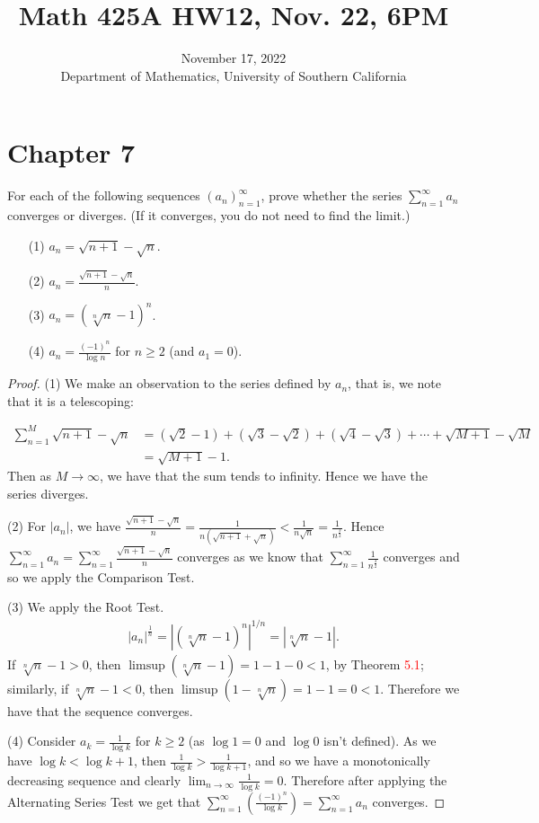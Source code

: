 \documentclass[oneside]{amsart}
\title{Math 425A HW12, Nov. 22, 6PM}
\date{November 17, 2022 \\ {Department of Mathematics, University of Southern California}}
\theoremstyle{definition}
\begin{document}
\maketitle
\setcounter{tocdepth}{4}
\setcounter{secnumdepth}{4}
 \section*{Chapter 7}
\begin{tcolorbox}[colback=black!5!white,colframe=black!75!black,title= Exercise $2.1.$]  For each of the following sequences $(a_n)_{n=1}^\infty$, prove whether the series $ \sum _{n=1}^\infty a_n$ converges or diverges. (If it converges, you do not need to find the limit.)
\begin{itemize}
	\item [(1)] $a_n = \sqrt{n+1} - \sqrt{n}$.
	\item [(2)] $a_n = \frac{\sqrt{n+1} - {\sqrt{n}}}{n}$.
	\item [(3)] $a_n = ( \sqrt[n]{n}-1)^n$.
	\item [(4)] $a_n = \frac{(-1)^n}{\log n}$ for $n \geq 2$ (and $a_1 = 0$).
\end{itemize}
\tcblower 
\begin{proof} 
(1) We make an observation to the series defined by $a_n$, that is, we note that it is a telescoping: 

\begin{align*}
	\sum_{n=1}^M \sqrt{n+1}-\sqrt{n} & = (\sqrt{2}-1) + (\sqrt{3}-\sqrt{2})+(\sqrt{4}-\sqrt{3}) + \cdots + \sqrt{M+1}-\sqrt{M} \\
	&= \sqrt{M+1}-1.
\end{align*}
Then as $M\to \infty$, we have that the sum tends to infinity. Hence we have the series diverges.

(2) For $|a_n|$, we have $\frac{\sqrt{n+1} - {\sqrt{n}}}{n} = \frac{1}{n(\sqrt{n+1} + \sqrt{n})} < \frac{1}{n \sqrt{n}} = \frac{1}{n^\frac{3}{2}}$. Hence $\sum_{n=1}^\infty a_n = \sum_{n=1}^\infty \frac{\sqrt{n+1} - {\sqrt{n}}}{n}$ converges as we know that $\sum_{n=1}^\infty  \frac{1}{n^\frac{3}{2}}$ converges and so we apply the Comparison Test.

(3) We apply the Root Test. 
\begin{align*}
	|a_n|^{\frac{1}{n}} = |( \sqrt[n]{n} -1)^n|^{1/n} = |\sqrt[n]{n}-1|.
\end{align*}
If $\sqrt[n]{n}-1>0$, then $\limsup (\sqrt[n]{n}-1 )= 1-1 -0 <1 $, by Theorem \textcolor{red}{5.1}; similarly, if $\sqrt[n]{n}-1<0$, then 
$ \limsup (1-\sqrt[n]{n})=1-1 = 0 < 1$. Therefore we have that the sequence converges.

(4) Consider $a_k = \frac{1}{\log k}$ for $k \geq 2$ (as $\log 1 = 0$ and $\log 0$ isn't defined). As we have $\log k< \log k+1$, then $\frac{1}{\log k} > \frac{1}{\log k+1}$, and so we have a monotonically decreasing sequence and clearly $\lim _{n \to \infty} \frac{1}{\log k} = 0$. Therefore after applying the Alternating Series Test we get that $ \sum _{n=1}^\infty  \left (\frac{(-1)^n}{\log k} \right ) = \sum_{n=1}^\infty a_n$ converges.
\end{proof}
\end{tcolorbox}
\end{document}
